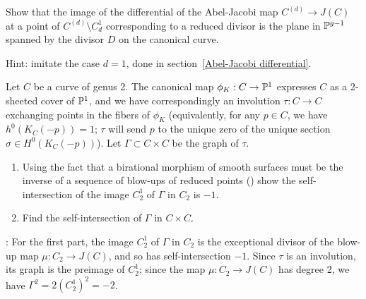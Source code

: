 \begin{exercise} \label{comparison with geometric RR}
Show that the image of the differential of the Abel-Jacobi map $C^{(d)} \to J(C)$ at a point of $C^{(d)} \setminus C^1_d$  corresponding to a reduced divisor is  the plane in $\PP^{g-1}$ spanned by the divisor $D$ on the canonical curve.

Hint: imitate the case $d=1$, done in section~\ref{Abel-Jacobi differential}.
\end{exercise}

\begin{exercise}\label{blow-up of $J(C)$ at a point}
Let $C$ be a curve of genus 2. The canonical map $\phi_K : C \to \PP^1$ expresses $C$ as a 2-sheeted cover of $\PP^1$, and we have correspondingly an involution $\tau : C \to C$ exchanging points in the fibers of $\phi_K$ (equivalently, for any $p \in C$, we have $h^0(K_C(-p)) = 1$; $\tau$ will send $p$ to the unique zero of the unique section $\sigma \in H^0(K_C(-p))$). Let $\Gamma \subset C \times C$ be the graph of $\tau$.
\begin{enumerate}
\item Using the fact that a birational morphism of smooth surfaces must be the inverse of a sequence of blow-ups of reduced points (\cite[V.??]{H}) show the self-intersection of the image $C^1_2$ of $\Gamma$ in $C_2$ is $-1$.
\item Find the self-intersection of $\Gamma$ in $C \times C$.
\end{enumerate}

: For the first part, the image $C^1_2$  of $\Gamma$ in $C_2$ is the exceptional divisor of the blow-up map $\mu : C_2 \to J(C)$, and so has self-intersection $-1$. Since $\tau$ is an involution, its graph is the preimage of $C^1_2$; since the map $\mu : C_2 \to J(C)$ has degree 2, we have $\Gamma^2 = 2(C^1_2)^2 = -2$.
\end{exercise}

